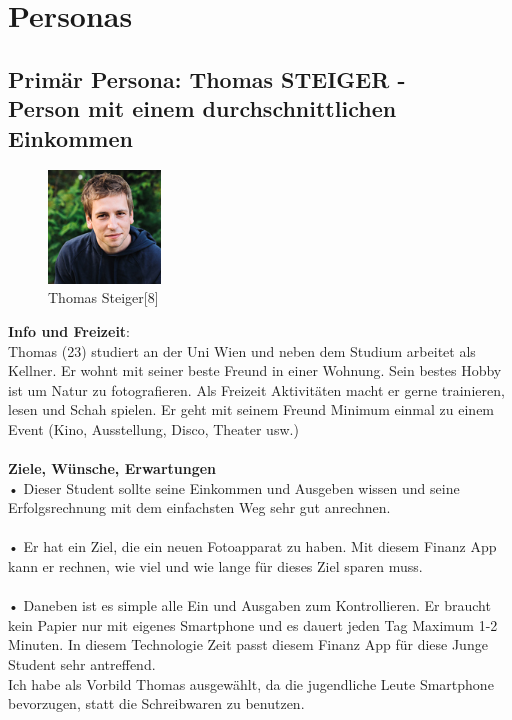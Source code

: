 \documentclass[runningheads,a4paper]{llncs}
\begin{document}
\section{Personas}
\subsection{Primär Persona: Thomas STEIGER - \\Person mit einem durchschnittlichen Einkommen}

\begin{figure}
\centering
\includegraphics[height=3cm,width=3cm]{thomasSteiger}
\caption{Thomas Steiger[8]}

\end{figure}
                                          
\textbf{Info und Freizeit}: \\
Thomas (23) studiert an der Uni Wien und neben dem Studium arbeitet als Kellner. Er wohnt mit seiner beste Freund in einer Wohnung. Sein bestes Hobby ist um Natur zu fotografieren. Als Freizeit Aktivitäten macht er gerne trainieren, lesen und Schah spielen. Er geht mit seinem Freund Minimum einmal zu einem Event (Kino, Ausstellung, Disco, Theater usw.) \\\\
\textbf{ Ziele, Wünsche, Erwartungen}\\ • Dieser Student sollte seine Einkommen und Ausgeben wissen und seine Erfolgsrechnung mit dem einfachsten Weg sehr gut anrechnen.\\\\
• Er hat ein Ziel, die ein neuen Fotoapparat zu haben. Mit diesem Finanz App kann er rechnen, wie viel und wie lange für dieses Ziel sparen muss.\\\\
• Daneben ist es simple alle Ein und Ausgaben zum Kontrollieren. Er braucht kein Papier nur mit eigenes Smartphone und es dauert jeden Tag Maximum 1-2 Minuten.  In diesem Technologie Zeit passt diesem Finanz App für diese Junge Student sehr antreffend.\\
 Ich habe als Vorbild Thomas ausgewählt, da die jugendliche Leute Smartphone bevorzugen, statt die Schreibwaren zu benutzen. 
\end{document}

